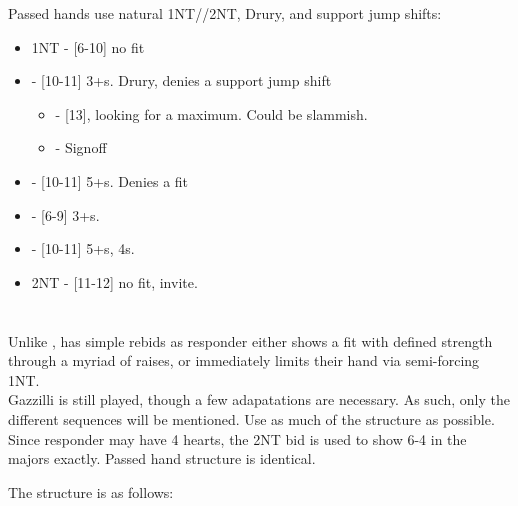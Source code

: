 \documentclass[12pt]{report}
\newcommand{\n}{\\}
\newcommand{\ul}[1]{\begin{itemize}#1\end{itemize}}
\newcommand{\li}{\item[~]}
\newcommand{\bidsection}[2]{\section{\texorpdfstring{#1}{#2}}}
\begin{document}
    Passed hands use natural 1NT//2NT,  Drury, and support jump shifts:
    \ul {
        \li 1NT - [6-10] no fit
        \li \cl2 - [10-11] 3+\he{}s.  Drury, denies a support jump shift
        \ul {
            \li \di2 - [13], looking for a maximum.  Could be slammish.
            \li \he2 - Signoff
        }
        \li \di2 - [10-11] 5+\di{}s.  Denies a fit
        \li \he2 - [6-9] 3+\he{}s.
        \li \sp2 - [10-11] 5+\sp{}s, 4\he{}s.
        \li 2NT - [11-12] no fit, invite.
    }
\newpage

\bidsection{}{1♠} \label{2:5}

    Unlike ,  has simple rebids as responder either shows a fit with defined strength through a myriad of raises, or immediately limits their hand via semi-forcing 1NT.\n

    Gazzilli is still played, though a few adapatations are necessary.  As such, only the different sequences will be mentioned.  Use as much of the  structure as possible.\n

    Since responder may have 4 hearts, the 2NT bid is used to show 6-4 in the majors exactly.  Passed hand structure is identical.
    
    The structure is as follows:
\end{document}
